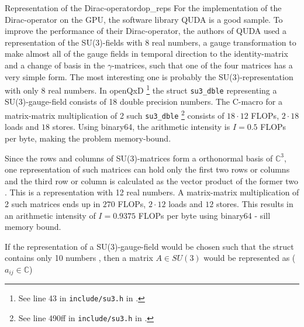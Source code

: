 \documentclass{article}
\theoremstyle{plain} %
\theoremstyle{convention} %
\theoremstyle{remark} %
\def\code#1{\texttt{#1}}
\numberwithin{equation}{section}
\begin{document}
\begin{proposal}{Representation of the Dirac-operator}{dop_reps}
For the implementation of the Dirac-operator on the GPU, the software library QUDA \cite{clark2010} is a good sample. To improve the performance of their Dirac-operator, the authors of QUDA used a representation of the SU(3)-fields with \num{8} real numbers, a gauge transformation to make almost all of the gauge fields in temporal direction to the identity-matrix and a change of basis in the $\gamma$-matrices, such that one of the four matrices has a very simple form. The most interesting one is probably the SU(3)-representation with only \num{8} real numbers. In openQxD \footnote{See line 43 in \code{include/su3.h} in \cite{openqxd}.} the struct \code{su3\_dble} representing a SU(3)-gauge-field consists of \num{18} double precision numbers. The C-macro for a matrix-matrix multiplication of 2 such \code{su3\_dble} \footnote{See line 490ff in \code{include/su3.h} in \cite{openqxd}.} consists of $18 \cdot 12$ FLOPs, $2 \cdot 18$ loads and $18$ stores. Using \gls{binary64}, the arithmetic intensity is $I = 0.5$ FLOPs per byte, making the problem memory-bound.

Since the rows and columns of SU(3)-matrices form a orthonormal basis of $\mathbb{C}^3$, one representation of such matrices can hold only the first two rows or columns and the third row or column is calculated as the vector product of the former two \cite{deforcrand1985}. This is a representation with \num{12} real numbers. A matrix-matrix multiplication of 2 such matrices ends up in $270$ FLOPs, $2 \cdot 12$ loads and $12$ stores. This results in an arithmetic intensity of $I = 0.9375$ FLOPs per byte using \gls{binary64} - sill memory bound.

If the representation of a SU(3)-gauge-field would be chosen such that the struct contains only \num{10} numbers \cite{bunk1986}, then a matrix $A \in SU(3)$ would be represented as ($a_{ij} \in \mathbb{C}$)


\end{proposal}
\end{document}
